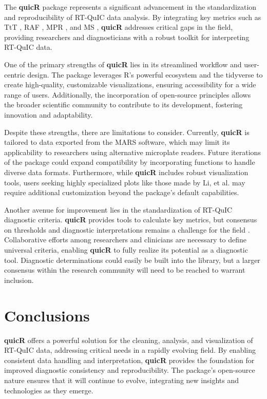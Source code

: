 \documentclass[preprint,12pt,a4paper]{elsarticle}
\begin{document}
The \textbf{quicR} package represents a significant advancement in the standardization and reproducibility of RT-QuIC data analysis. By integrating key metrics such as TtT \cite{Orru2015}, RAF \cite{Gallups2022}, MPR \cite{Rowden2023}, and MS \cite{Henderson2015}, \textbf{quicR} addresses critical gaps in the field, providing researchers and diagnosticians with a robust toolkit for interpreting RT-QuIC data.

One of the primary strengths of \textbf{quicR} lies in its streamlined workflow and user-centric design. The package leverages R’s powerful ecosystem and the tidyverse \cite{tidyverse2019} to create high-quality, customizable visualizations, ensuring accessibility for a wide range of users. Additionally, the incorporation of open-source principles allows the broader scientific community to contribute to its development, fostering innovation and adaptability.

Despite these strengths, there are limitations to consider. Currently, \textbf{quicR} is tailored to data exported from the MARS software, which may limit its applicability to researchers using alternative microplate readers. Future iterations of the package could expand compatibility by incorporating functions to handle diverse data formats. Furthermore, while \textbf{quicR} includes robust visualization tools, users seeking highly specialized plots like those made by Li, et al.\cite{Li2025} may require additional customization beyond the package’s default capabilities.

Another avenue for improvement lies in the standardization of RT-QuIC diagnostic criteria. \textbf{quicR} provides tools to calculate key metrics, but consensus on thresholds and diagnostic interpretations remains a challenge for the field \cite{Rowden2023}. Collaborative efforts among researchers and clinicians are necessary to define universal criteria, enabling \textbf{quicR} to fully realize its potential as a diagnostic tool. Diagnostic determinations could easily be built into the library, but a larger consensus within the research community will need to be reached to warrant inclusion.

\section{Conclusions} 
\textbf{quicR} offers a powerful solution for the cleaning, analysis, and visualization of RT-QuIC data, addressing critical needs in a rapidly evolving field. By enabling consistent data handling and interpretation, \textbf{quicR} provides the foundation for improved diagnostic consistency and reproducibility. The package's open-source nature ensures that it will continue to evolve, integrating new insights and technologies as they emerge.
\end{document}
